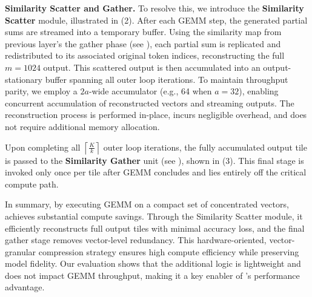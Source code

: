 \textbf{Similarity Scatter and Gather.}
To resolve this, we introduce the \textbf{Similarity Scatter} module, illustrated in (2). 
After each GEMM step, the generated partial sums are streamed into a temporary buffer. 
Using the similarity map from previous layer's the gather phase (see ), each partial sum is replicated and redistributed to its associated original token indices, reconstructing the full $m=1024$ output.
This scattered output is then accumulated into an output-stationary buffer spanning all outer loop iterations. 
To maintain throughput parity, we employ a $2a$-wide accumulator (e.g., 64 when $a = 32$), enabling concurrent accumulation of reconstructed vectors and streaming outputs. 
The reconstruction process is performed in-place, incurs negligible overhead, and does not require additional memory allocation.

Upon completing all $\left\lceil \frac{K}{k} \right\rceil$ outer loop iterations, the fully accumulated output tile is passed to the \textbf{Similarity Gather} unit (see ), shown in (3). 
This final stage is invoked only once per tile after GEMM concludes and lies entirely off the critical compute path.

In summary, by executing GEMM on a compact set of concentrated vectors, \proj{} achieves substantial compute savings.  
Through the Similarity Scatter module, it efficiently reconstructs full output tiles with minimal accuracy loss, and the final gather stage removes vector-level redundancy.  
This hardware-oriented, vector-granular compression strategy ensures high compute efficiency while preserving model fidelity.  
Our evaluation shows that the additional logic is lightweight and does not impact GEMM throughput, making it a key enabler of \proj{}'s performance advantage.
